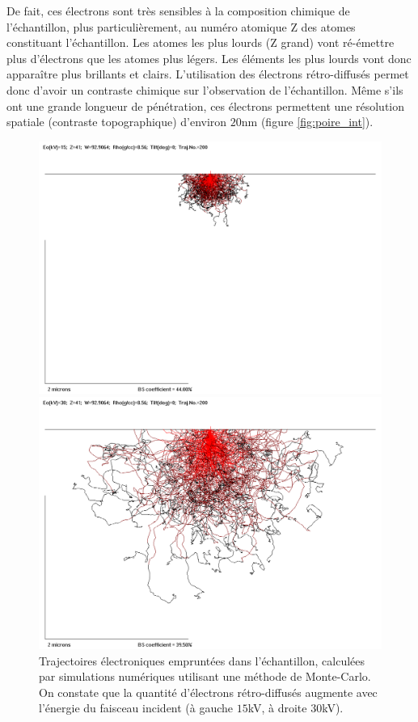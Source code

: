 \documentclass[a4paper,12pt]{article}
\begin{document}
De fait, ces électrons sont très sensibles à la composition chimique de l'échantillon, plus particulièrement, 
au numéro atomique Z des atomes constituant l'échantillon.
Les atomes les plus lourds (Z grand) vont ré-émettre plus d'électrons que les atomes plus légers.
Les éléments les plus lourds vont donc apparaître plus brillants et clairs. L'utilisation des électrons rétro-diffusés permet donc d'avoir un contraste chimique sur l'observation de l'échantillon.
Même s'ils ont une grande longueur de pénétration, ces électrons permettent une résolution spatiale (contraste topographique) d'environ $20$nm (figure \ref{fig:poire_int}).
\begin{figure}
\begin{minipage}[c]{.50\linewidth}
\centering
\includegraphics[width = 1 \textwidth]{images/mt_15kv.png}
\end{minipage}
\begin{minipage}[c]{.50\linewidth}
\includegraphics[width = 1 \textwidth]{images/mt_30kv.png}
\end{minipage}
\caption{Trajectoires électroniques empruntées dans l'échantillon, calculées par simulations numériques utilisant une méthode de Monte-Carlo. On constate que la quantité d'électrons rétro-diffusés augmente avec l'énergie du faisceau incident (à gauche $15$kV, à droite $30$kV).}
\label{fig:montecarlo}
\end{figure}
\end{document}
